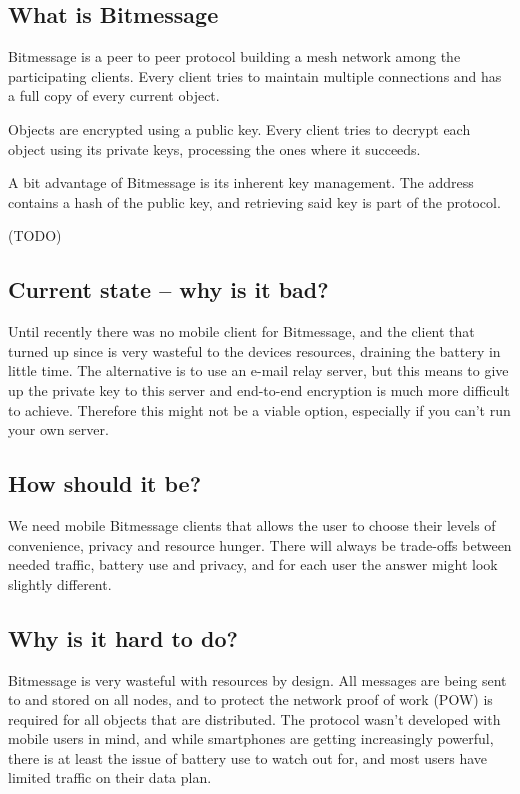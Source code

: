 \documentclass{bfh}
\begin{document}
  \subsection{What is Bitmessage}
  
  Bitmessage is a peer to peer protocol building a mesh network among the participating clients. Every client tries to maintain multiple connections and has a full copy of every current object.
  
  Objects are encrypted using a public key. Every client tries to decrypt each object using its private keys, processing the ones where it succeeds.
  
  A bit advantage of Bitmessage is its inherent key management. The address contains a hash of the public key, and retrieving said key is part of the protocol.

  (TODO)\newpage

  \subsection{Current state -- why is it bad?}
  Until recently there was no mobile client for Bitmessage, and the client that turned up since is very wasteful to the devices resources, draining the battery in little time. The alternative is to use an e-mail relay server, but this means to give up the private key to this server and end-to-end encryption is much more difficult to achieve. Therefore this might not be a viable option, especially if you can't run your own server.

  \subsection{How should it be?}
  We need mobile Bitmessage clients that allows the user to choose their levels of convenience, privacy and resource hunger. There will always be trade-offs between needed traffic, battery use and privacy, and for each user the answer might look slightly different.

  \subsection{Why is it hard to do?}
  Bitmessage is very wasteful with resources by design. All messages are being sent to and stored on all nodes, and to protect the network proof of work (POW) is required for all objects that are distributed. The protocol wasn't developed with mobile users in mind, and while smartphones are getting increasingly powerful, there is at least the issue of battery use to watch out for, and most users have limited traffic on their data plan.
\end{document}
